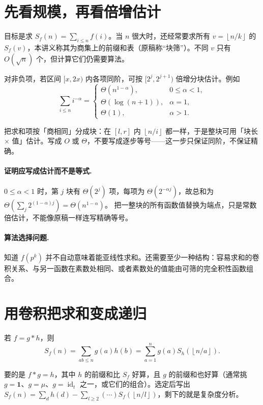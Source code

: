 \documentclass[UTF8,a4paper,11pt,twoside,openright,fontset=fandol]{ctexbook}
\theoremstyle{definition}
\newcommand{\one}{\mathbf 1}
\newcommand{\id}{\operatorname{id}}
\newcommand{\floor}[1]{\left\lfloor #1\right\rfloor}
\begin{document}
\section{先看规模，再看倍增估计}
目标是求 $S_f(n)=\sum_{i\le n}f(i)$。当 $n$ 很大时，还经常要求所有 $v=\floor{n/k}$ 的 $S_f(v)$，本讲义称其为商集上的前缀和表（原稿称“块筛”）。不同 $v$ 只有 $O(\sqrt n)$ 个，但计算它们仍需要算法。

对非负项，若区间 $[x,2x)$ 内各项同阶，可按 $[2^j,2^{j+1})$ 倍增分块估计。例如
\[
 \sum_{i\le n}i^{-\alpha}=
 \begin{cases}
 \Theta(n^{1-\alpha}),&0\le\alpha<1,\\
 \Theta(\log(n+1)),&\alpha=1,\\
 \Theta(1),&\alpha>1.
 \end{cases}
\]

\begin{tip}
把求和项按「商相同」分成块：在 $[l,r]$ 内 $\floor{n/i}$ 都一样，于是整块可用「块长 $\times$ 值」估计。写成 $O$ 或 $\Theta$，不要写成逐步等号——这一步只保证同阶，不保证精确。
\end{tip}


\paragraph{证明应写成估计而不是等式.}
$0\le\alpha<1$ 时，第 $j$ 块有 $\Theta(2^j)$ 项，每项为 $\Theta(2^{-\alpha j})$，故总和为 $\Theta(\sum_j2^{(1-\alpha)j})=\Theta(n^{1-\alpha})$。
把一整块的所有函数值替换为端点，只是常数倍估计，不能像原稿一样连写精确等号。
\paragraph{算法选择问题.} 知道 $f(p^k)$ 并不自动意味着能亚线性求和。还需要至少一种结构：容易求和的卷积关系、与另一函数在素数处相同、或者素数处的值能由可筛的完全积性函数组合。


\section{用卷积把求和变成递归}
若 $f=g*h$，则
\[
S_f(n)=\sum_{ab\le n}g(a)h(b)
=\sum_{a=1}^n g(a)S_h(\floor{n/a}).
\]

\begin{tip}[选 $g$ 的原则]
要的是 $f*g=h$，其中 $h$ 的前缀和比 $S_f$ 好算，且 $g$ 的前缀和也好算（通常挑 $g=\one$、$g=\mu$、$g=\id_t$ 之一，或它们的组合）。选定后写出 $S_f(n)=\sum_{d}h(d)-\sum_{l\ge2}(\cdots)S_f(\floor{n/l})$，剩下的就是复杂度分析。
\end{tip}
\end{document}
